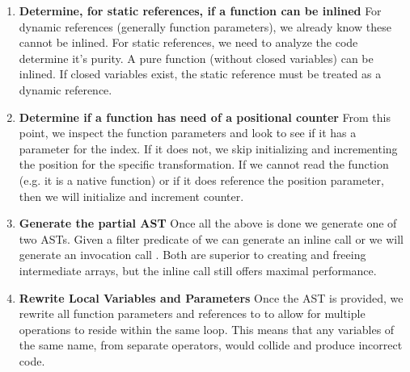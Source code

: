 \begin{enumerate}
  \item \textbf{Determine, for static references, if a function can be inlined}
    For dynamic references (generally  function parameters), we already know these cannot be inlined.  For static references, we need to analyze the code determine it's purity.  A pure function (without closed variables) can be inlined.  If closed variables exist, the static reference must be treated as a dynamic reference.
  \item \textbf{Determine if a function has need of a positional counter}
    From this point, we inspect the function parameters and look to see if it has a parameter for the index.  If it does not, we skip initializing and incrementing the position for the specific transformation.  If we cannot read the function (e.g. it is a native function) or if it does reference the position parameter, then we will initialize and increment counter.
  \item \textbf{Generate the partial AST}
    Once all the above is done we generate one of two ASTs. Given a filter predicate of  we can generate an inline call  or we will generate an invocation call .  Both are superior to creating and freeing intermediate arrays, but the inline call still offers maximal performance.
  \item \textbf{Rewrite Local Variables and Parameters}
    Once the AST is provided, we rewrite all function parameters and references to  to allow for multiple operations to reside within the same  loop.  This means that any variables of the same name, from separate operators, would collide and produce incorrect code.  
\end{enumerate}